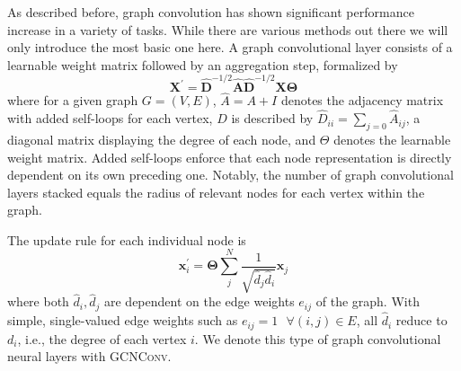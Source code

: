 \documentclass{bioinfo}
\begin{document}
As described before, graph convolution has shown significant
performance increase in a variety of tasks. While there are various
methods out there we will only introduce the most basic one here. A
graph convolutional layer \citet{GCNConv} consists of a
learnable weight matrix followed by an aggregation step, formalized by
\begin{equation}
	\mathbf{X}^{\prime} = \mathbf{\hat{D}}^{-1/2} \mathbf{\hat{A}}
	\mathbf{\hat{D}}^{-1/2} \mathbf{X} \mathbf{\Theta}
\end{equation}
where for a given graph $G=(V,E)$, $\hat{A} = A + I$ denotes the
adjacency matrix with added self-loops for each vertex, $D$ is
described by $\hat{D}_{ii} = \sum_{j=0} \hat{A}_{ij}$, a diagonal
matrix displaying the degree of each node, and $\Theta$ denotes the
learnable weight matrix. Added self-loops enforce that each node
representation is directly dependent on its own preceding
one. Notably, the number of graph convolutional layers stacked equals
the radius of relevant nodes for each vertex within the graph.

The update rule for each individual node is
\begin{equation}
	\mathbf{x}^{\prime}_i = \mathbf{\Theta} \sum^{N}_{j}
	\frac{1}{\sqrt{\hat{d}_j \hat{d}_i}} \mathbf{x}_j
\end{equation}
where both $\hat{d}_i, \hat{d}_j$ are dependent on the edge weights
$e_{ij}$ of the graph. With simple, single-valued edge weights such as
$e_{ij}=1 \text{ }\forall (i,j)\in E$, all $\hat{d}_i$ reduce to
$d_i$, i.e., the degree of each vertex $i$. We denote this type of
graph convolutional neural layers with \textsc{GCNConv}.
\end{document}
